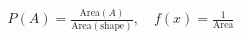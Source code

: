 \documentclass[preview]{standalone}
\begin{document}
\begin{align*}
P(A) = \frac{\text{Area}(A)}{\text{Area}(\text{shape})}, \quad f(x) = \frac{1}{\text{Area}}
\end{align*}
\end{document}
